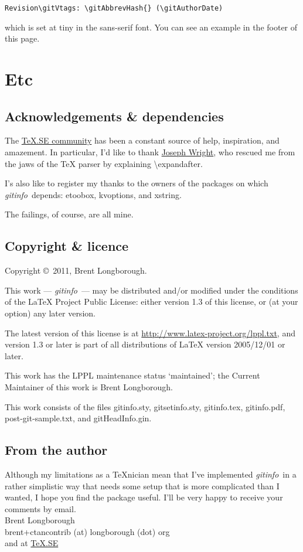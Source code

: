 \documentclass[a4paper,12pt,twoside,openany]{memoir}
\newcommand{\sfit}[1]{\textit{#1}}
\newcommand{\tpname}{\sfit{gitinfo}}
\newcommand{\ginname}{gitHeadInfo.gin}
\begin{document}
\noindent
\verb!Revision\gitVtags: \gitAbbrevHash{} (\gitAuthorDate)!
\vspace{0.5\baselineskip}

\noindent
which is set at tiny in the sans-serif font.
You can see an example in the footer of this page.
\chapter{Etc}
\section{Acknowledgements \& dependencies}

The \href{http://tex.stackexchange.com}{\TeX.SE community}
has been a constant source of help, inspiration, and amazement.
In particular, I'd like to thank
\href{http://tex.stackexchange.com/users/73/joseph-wright}{Joseph Wright},
who rescued me from the jaws of the TeX parser by explaining
\textbackslash expandafter.

I's also like to register my thanks to the owners of the packages on which
\tpname\ depends: etoobox, kvoptions, and xstring.

The failings, of course, are all mine.
\section{Copyright \& licence}
Copyright \copyright\ 2011, Brent Longborough.

This work --- \tpname\ --- may be distributed and/or modified under the
conditions of the LaTeX Project Public License: either version 1.3
of this license, or (at your option) any later version.

The latest version of this license is at
\url{http://www.latex-project.org/lppl.txt},
and version 1.3 or later is part of all distributions of \LaTeX
version 2005/12/01 or later.

This work has the LPPL maintenance status `maintained';
the Current Maintainer of this work is Brent Longborough.

This work consists of the files 
gitinfo.sty, gitsetinfo.sty, gitinfo.tex, gitinfo.pdf,
post-git-sample.txt, and \ginname.
\section{From the author}
Although my limitations as a \TeX nician
mean that I've implemented \tpname\ in a rather simplistic way
that needs some setup that is more complicated than I wanted,
I hope you find the package useful.
I'll be very happy to receive your comments by email.\\[\baselineskip]
Brent Longborough\\[\baselineskip]
\textsf{brent+ctancontrib (at) longborough (dot) org}\\
and at \href{http://tex.stackexchange.com/users/344/brent-longborough}{\TeX.SE}
\end{document}
